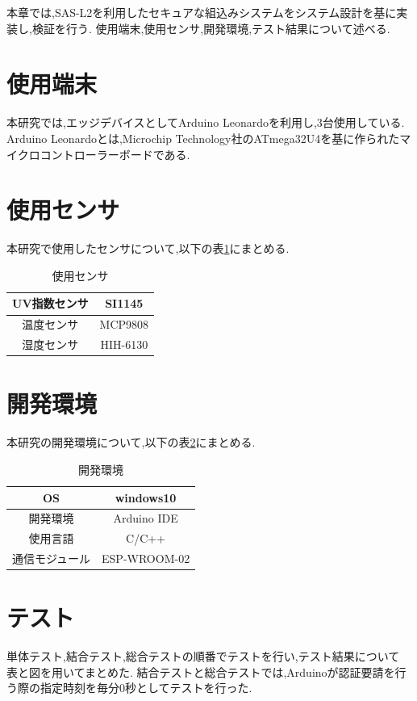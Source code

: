 
本章では,SAS-L2を利用したセキュアな組込みシステムをシステム設計を基に実装し,検証を行う.
使用端末,使用センサ,開発環境,テスト結果について述べる.
\section{使用端末}
本研究では,エッジデバイスとしてArduino Leonardoを利用し,3台使用している.
Arduino Leonardoとは,Microchip Technology社のATmega32U4を基に作られたマイクロコントローラーボードである.

\section{使用センサ}
本研究で使用したセンサについて,以下の表\ref{tab:sensor}にまとめる.
\begin{table}[H]
\centering
\caption{使用センサ}
\label{tab:sensor}
\begin{tabular}{|c|c|} \hline
 UV指数センサ & SI1145\\ \hline
 温度センサ & MCP9808\\ \hline
 湿度センサ & HIH-6130\\ \hline
\end{tabular}
\end{table}

\section{開発環境}
本研究の開発環境について,以下の表\ref{tab:kankyo}にまとめる.
\begin{table}[H]
\centering
\caption{開発環境}
\label{tab:kankyo}
\begin{tabular}{|c|c|} \hline
 OS & windows10\\ \hline
 開発環境 & Arduino IDE \\ \hline
 使用言語 & C/C++ \\ \hline
 通信モジュール & ESP-WROOM-02 \\ \hline
\end{tabular}
\end{table}

\section{テスト}
単体テスト,結合テスト,総合テストの順番でテストを行い,テスト結果について
表と図を用いてまとめた.
結合テストと総合テストでは,Arduinoが認証要請を行う際の指定時刻を毎分0秒としてテストを行った.

